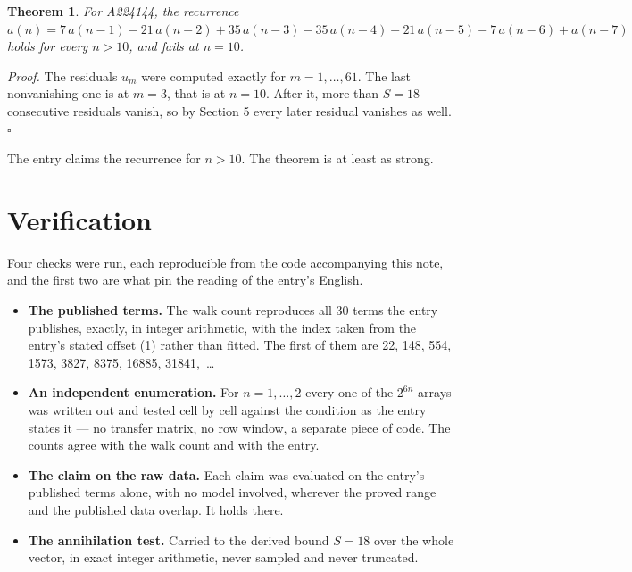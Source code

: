 \documentclass[11pt]{article}
\newtheorem{theorem}{Theorem}
\theoremstyle{definition}
\begin{document}
\begin{theorem} For A224144, the recurrence $a(n) = 7\,a(n-1) - 21\,a(n-2) + 35\,a(n-3) - 35\,a(n-4) + 21\,a(n-5) - 7\,a(n-6) + a(n-7)$ holds for every $n > 10$, and fails at $n = 10$.\end{theorem}

{\itshape Proof.} The residuals $u_m$ were computed exactly for $m = 1,\dots,61$. The last nonvanishing one is at $m = 3$, that is at $n = 10$. After it, more than $S = 18$ consecutive residuals vanish, so by Section 5 every later residual vanishes as well. $\square$

The entry claims the recurrence for $n > 10$. The theorem is at least as strong.

\section{Verification}

Four checks were run, each reproducible from the code accompanying this note, and the first two are what pin the reading of the entry's English.

\begin{itemize}

\item {\bfseries The published terms.} The walk count reproduces all 30 terms the entry publishes, exactly, in integer arithmetic, with the index taken from the entry's stated offset (1) rather than fitted. The first of them are 22, 148, 554, 1573, 3827, 8375, 16885, 31841,~\dots

\item {\bfseries An independent enumeration.} For $n = 1,\dots,2$ every one of the $2^{6n}$ arrays was written out and tested cell by cell against the condition as the entry states it --- no transfer matrix, no row window, a separate piece of code. The counts agree with the walk count and with the entry.

\item {\bfseries The claim on the raw data.} Each claim was evaluated on the entry's published terms alone, with no model involved, wherever the proved range and the published data overlap. It holds there.

\item {\bfseries The annihilation test.} Carried to the derived bound $S = 18$ over the whole vector, in exact integer arithmetic, never sampled and never truncated.

\end{itemize}
\end{document}
